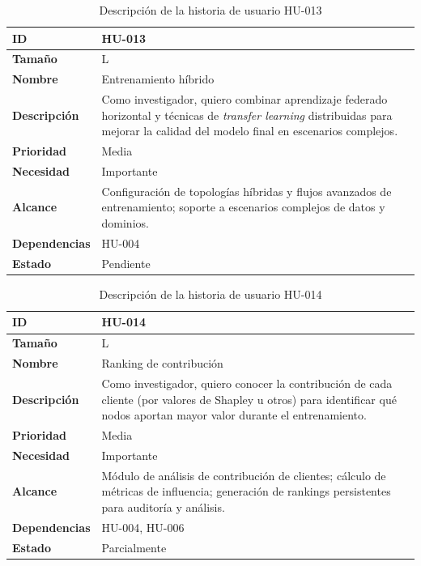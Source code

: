 \documentclass{report}
\begin{document}
\begin{table}[H]
\centering
\caption{Descripción de la historia de usuario HU-013}
\label{tab:hu013}
\begin{tabular}{|l|p{12cm}|}
\hline
\textbf{ID} & HU-013 \\ \hline
\textbf{Tamaño} & L \\ \hline
\textbf{Nombre} & Entrenamiento híbrido \\ \hline
\textbf{Descripción} & 
Como investigador, quiero combinar aprendizaje federado horizontal y técnicas de \textit{transfer learning} distribuidas para mejorar la calidad del modelo final en escenarios complejos. \\ \hline
\textbf{Prioridad} & Media \\ \hline
\textbf{Necesidad} & Importante \\ \hline
\textbf{Alcance} & Configuración de topologías híbridas y flujos avanzados de entrenamiento; soporte a escenarios complejos de datos y dominios. \\ \hline
\textbf{Dependencias} & HU-004 \\ \hline
\textbf{Estado} & Pendiente \\ \hline
\end{tabular}
\end{table}



\begin{table}[H]
\centering
\caption{Descripción de la historia de usuario HU-014}
\label{tab:hu014}
\begin{tabular}{|l|p{12cm}|}
\hline
\textbf{ID} & HU-014 \\ \hline
\textbf{Tamaño} & L \\ \hline
\textbf{Nombre} & Ranking de contribución \\ \hline
\textbf{Descripción} & 
Como investigador, quiero conocer la contribución de cada cliente (por valores de Shapley u otros) para identificar qué nodos aportan mayor valor durante el entrenamiento. \\ \hline
\textbf{Prioridad} & Media \\ \hline
\textbf{Necesidad} & Importante \\ \hline
\textbf{Alcance} & Módulo de análisis de contribución de clientes; cálculo de métricas de influencia; generación de rankings persistentes para auditoría y análisis. \\ \hline
\textbf{Dependencias} & HU-004, HU-006 \\ \hline
\textbf{Estado} & Parcialmente \\ \hline
\end{tabular}
\end{table}
\end{document}
